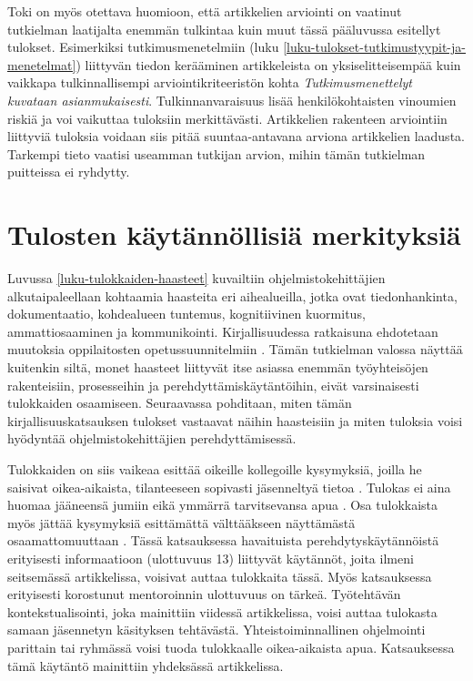 \documentclass[utf8]{gradu3}
\begin{document}
Toki on myös otettava huomioon, että artikkelien arviointi on vaatinut tutkielman laatijalta enemmän tulkintaa kuin muut tässä pääluvussa esitellyt tulokset. Esimerkiksi tutkimusmenetelmiin (luku \ref{luku-tulokset-tutkimustyypit-ja-menetelmat}) liittyvän tiedon kerääminen artikkeleista on yksiselitteisempää kuin vaikkapa tulkinnallisempi arviointikriteeristön kohta \textit{Tutkimusmenettelyt kuvataan asianmukaisesti}. Tulkinnanvaraisuus lisää henkilökohtaisten vinoumien riskiä ja voi vaikuttaa tuloksiin merkittävästi. Artikkelien rakenteen arviointiin liittyviä tuloksia voidaan siis pitää suuntaa-antavana arviona artikkelien laadusta. Tarkempi tieto vaatisi useamman tutkijan arvion, mihin tämän tutkielman puitteissa ei ryhdytty.


\section{Tulosten käytännöllisiä merkityksiä}

Luvussa \ref{luku-tulokkaiden-haasteet} kuvailtiin ohjelmistokehittäjien alkutaipaleellaan kohtaamia haasteita eri aihealueilla, jotka ovat tiedonhankinta, dokumentaatio, kohdealueen tuntemus, kognitiivinen kuormitus, ammattiosaaminen ja kommunikointi. Kirjallisuudessa ratkaisuna ehdotetaan muutoksia oppilaitosten opetussuunnitelmiin %
\parencites%
    {radermacher-ym-2015}%
    {begel-simon-2008}%
    {begel-simon-2008-all-over-again}%
    {garousi-ym-2020}%
    {kulkarni-ym-2010}%
\relax.
%
Tämän tutkielman valossa näyttää kuitenkin siltä, monet haasteet liittyvät itse asiassa enemmän työyhteisöjen rakenteisiin, prosesseihin ja perehdyttämiskäytäntöihin, eivät varsinaisesti tulokkaiden osaamiseen. Seuraavassa pohditaan, miten tämän kirjallisuuskatsauksen tulokset vastaavat näihin haasteisiin ja miten tuloksia voisi hyödyntää ohjelmistokehittäjien perehdyttämisessä.

Tulokkaiden on siis vaikeaa esittää oikeille kollegoille kysymyksiä, joilla he saisivat oikea-aikaista, tilanteeseen sopivasti jäsenneltyä tietoa %
\parencites%
    {ju-ym-2021}%
    {britto-ym-2019}%
    {craig-ym-2018}%
    {matturro-ym-2017}%
    {dagenais-ym-2010}%
    {begel-simon-2008}%
\relax
%
. 
Tulokas ei aina huomaa jääneensä jumiin eikä ymmärrä tarvitsevansa apua \parencite{begel-simon-2008}. Osa tulokkaista myös jättää kysymyksiä esittämättä välttääkseen näyttämästä osaamattomuuttaan 
\parencites%
    {radermacher-ym-2015}%
    {begel-simon-2008}%
\relax
% 
. Tässä katsauksessa havaituista perehdytyskäytännöistä erityisesti informaatioon (ulottuvuus 13) liittyvät käytännöt, joita ilmeni seitsemässä artikkelissa, voisivat auttaa tulokkaita tässä. Myös katsauksessa erityisesti korostunut mentoroinnin ulottuvuus on tärkeä. Työtehtävän kontekstualisointi, joka mainittiin viidessä artikkelissa, voisi auttaa tulokasta samaan jäsennetyn käsityksen tehtävästä. Yhteistoiminnallinen ohjelmointi parittain tai ryhmässä voisi tuoda tulokkaalle oikea-aikaista apua. Katsauksessa tämä käytäntö mainittiin yhdeksässä artikkelissa. 
\end{document}

